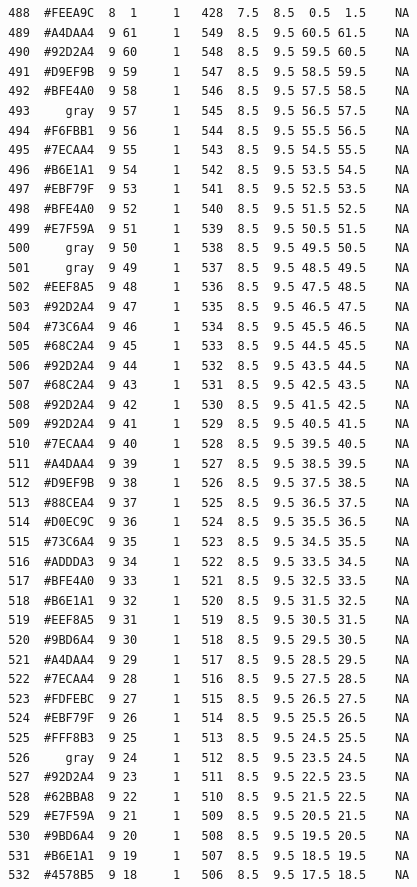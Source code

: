 \documentclass[12pt,twoside]{reedthesis}
\begin{document}
\begin{verbatim}
  488  #FEEA9C  8  1     1   428  7.5  8.5  0.5  1.5    NA
  489  #A4DAA4  9 61     1   549  8.5  9.5 60.5 61.5    NA
  490  #92D2A4  9 60     1   548  8.5  9.5 59.5 60.5    NA
  491  #D9EF9B  9 59     1   547  8.5  9.5 58.5 59.5    NA
  492  #BFE4A0  9 58     1   546  8.5  9.5 57.5 58.5    NA
  493     gray  9 57     1   545  8.5  9.5 56.5 57.5    NA
  494  #F6FBB1  9 56     1   544  8.5  9.5 55.5 56.5    NA
  495  #7ECAA4  9 55     1   543  8.5  9.5 54.5 55.5    NA
  496  #B6E1A1  9 54     1   542  8.5  9.5 53.5 54.5    NA
  497  #EBF79F  9 53     1   541  8.5  9.5 52.5 53.5    NA
  498  #BFE4A0  9 52     1   540  8.5  9.5 51.5 52.5    NA
  499  #E7F59A  9 51     1   539  8.5  9.5 50.5 51.5    NA
  500     gray  9 50     1   538  8.5  9.5 49.5 50.5    NA
  501     gray  9 49     1   537  8.5  9.5 48.5 49.5    NA
  502  #EEF8A5  9 48     1   536  8.5  9.5 47.5 48.5    NA
  503  #92D2A4  9 47     1   535  8.5  9.5 46.5 47.5    NA
  504  #73C6A4  9 46     1   534  8.5  9.5 45.5 46.5    NA
  505  #68C2A4  9 45     1   533  8.5  9.5 44.5 45.5    NA
  506  #92D2A4  9 44     1   532  8.5  9.5 43.5 44.5    NA
  507  #68C2A4  9 43     1   531  8.5  9.5 42.5 43.5    NA
  508  #92D2A4  9 42     1   530  8.5  9.5 41.5 42.5    NA
  509  #92D2A4  9 41     1   529  8.5  9.5 40.5 41.5    NA
  510  #7ECAA4  9 40     1   528  8.5  9.5 39.5 40.5    NA
  511  #A4DAA4  9 39     1   527  8.5  9.5 38.5 39.5    NA
  512  #D9EF9B  9 38     1   526  8.5  9.5 37.5 38.5    NA
  513  #88CEA4  9 37     1   525  8.5  9.5 36.5 37.5    NA
  514  #D0EC9C  9 36     1   524  8.5  9.5 35.5 36.5    NA
  515  #73C6A4  9 35     1   523  8.5  9.5 34.5 35.5    NA
  516  #ADDDA3  9 34     1   522  8.5  9.5 33.5 34.5    NA
  517  #BFE4A0  9 33     1   521  8.5  9.5 32.5 33.5    NA
  518  #B6E1A1  9 32     1   520  8.5  9.5 31.5 32.5    NA
  519  #EEF8A5  9 31     1   519  8.5  9.5 30.5 31.5    NA
  520  #9BD6A4  9 30     1   518  8.5  9.5 29.5 30.5    NA
  521  #A4DAA4  9 29     1   517  8.5  9.5 28.5 29.5    NA
  522  #7ECAA4  9 28     1   516  8.5  9.5 27.5 28.5    NA
  523  #FDFEBC  9 27     1   515  8.5  9.5 26.5 27.5    NA
  524  #EBF79F  9 26     1   514  8.5  9.5 25.5 26.5    NA
  525  #FFF8B3  9 25     1   513  8.5  9.5 24.5 25.5    NA
  526     gray  9 24     1   512  8.5  9.5 23.5 24.5    NA
  527  #92D2A4  9 23     1   511  8.5  9.5 22.5 23.5    NA
  528  #62BBA8  9 22     1   510  8.5  9.5 21.5 22.5    NA
  529  #E7F59A  9 21     1   509  8.5  9.5 20.5 21.5    NA
  530  #9BD6A4  9 20     1   508  8.5  9.5 19.5 20.5    NA
  531  #B6E1A1  9 19     1   507  8.5  9.5 18.5 19.5    NA
  532  #4578B5  9 18     1   506  8.5  9.5 17.5 18.5    NA

\end{verbatim}
\end{document}
